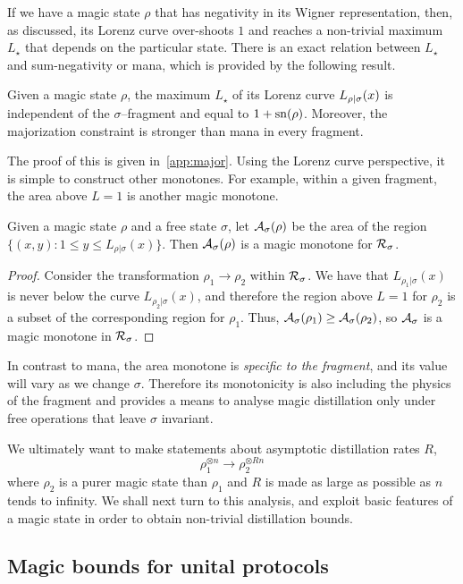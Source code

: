 \documentclass[pra,
aps,
twocolumn,
superscriptaddress,
groupedaddress,
nofootinbib,
reprint
]{revtex4-1}
\begin{document}
If we have a magic state $\rho$ that has negativity in its Wigner representation, then, as discussed, its Lorenz curve over-shoots $1$ and reaches a non-trivial maximum $L_\star$ that depends on the particular state. There is an exact relation between $L_\star$ and sum-negativity or mana, which is provided by the following result. 
\begin{theorem}\label{lem:lcmax}
	Given a magic state $\rho$, the maximum $L_\star$ of its Lorenz curve ${L_{\rho|\sigma}}(x)$ is independent of the $\sigma$--fragment and equal to $1+{{\rm{sn}}(\rho)}$. Moreover, the majorization constraint is stronger than mana in every fragment.
\end{theorem}
The proof of this is given in~\cref{app:major}. Using the Lorenz curve perspective, it is simple to construct other monotones. For example, within a given fragment, the area above $L=1$ is another magic monotone.
\begin{lemma}
Given a magic state $\rho$ and a free state $\sigma$, let ${\mathcal A}_\sigma(\rho)$ be the area of the region $\{(x, y): 1 \leq y \leq L_{\rho | \sigma}(x)\}$. Then ${\mathcal A}_\sigma(\rho)$ is a magic monotone for ${\mathcal R}_\sigma$.
\end{lemma}
\begin{proof}
Consider the transformation $\rho_1 \rightarrow \rho_2$ within ${\mathcal R}_\sigma$. We have that $L_{\rho_1|\sigma}(x)$ is never below the curve $L_{\rho_2|\sigma}(x)$, and therefore the region above $L=1$ for $\rho_2$ is a subset of the corresponding region for $\rho_1$. Thus, ${\mathcal A}_\sigma(\rho_1) \geq {\mathcal A}_\sigma(\rho_2)$, so ${\mathcal A}_\sigma$ is a magic monotone in ${\mathcal R}_\sigma$.
\end{proof}
In contrast to mana, the area monotone is \emph{specific to the fragment}, and its value will vary as we change $\sigma$. Therefore its monotonicity is also including the physics of the fragment and provides a means to analyse magic distillation only under free operations that leave $\sigma$ invariant.

We ultimately want to make statements about asymptotic distillation rates $R$,
\begin{equation}
\rho_1^{\otimes n} \longrightarrow \rho_2^{\otimes R n}
\end{equation}
where $\rho_2$ is a purer magic state than $\rho_1$ and $R$ is made as large as possible as $n$ tends to infinity. We shall next turn to this analysis, and exploit basic features of a magic state in order to obtain non-trivial distillation bounds.

\subsection{Magic bounds for unital protocols}
\label{sec:unital}
\end{document}

